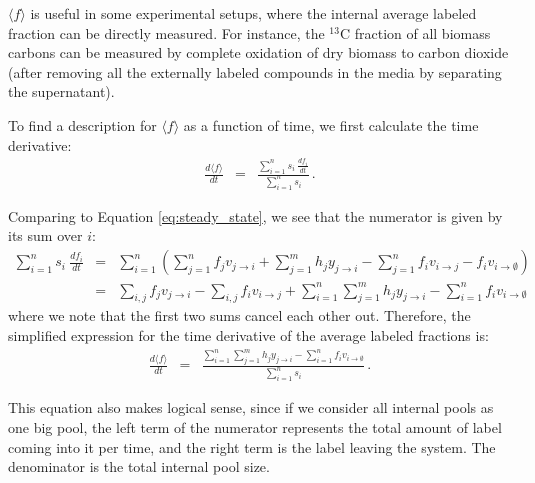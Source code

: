\documentclass{article}
\newcommand{\fin}{\ensuremath{\langle f \rangle}}
\newcommand{\flux}[2]{\ensuremath{v_{{#1} \rightarrow {#2}}}}
\begin{document}
$\fin$ is useful in some experimental setups, where the internal average labeled fraction can be directly measured. For instance, the $^{13}$C fraction of all biomass carbons can be measured by complete oxidation of dry biomass to carbon dioxide (after removing all the externally labeled compounds in the media by separating the supernatant).

To find a description for $\fin$ as a function of time, we first calculate the time derivative:
\begin{eqnarray}
\frac{d\fin}{dt} &=& \frac{\sum_{i=1}^{n} s_i~\frac{d f_i}{dt}}{\sum_{i=1}^{n} s_i} \,.
\end{eqnarray}

Comparing to Equation \ref{eq:steady_state}, we see that the numerator is given by its sum over $i$:
\begin{eqnarray}
    \sum_{i=1}^{n} s_i~\frac{d f_i}{dt} &=& \sum_{i=1}^n \left(\sum_{j=1}^{n} f_j\flux{j}{i} + \sum_{j=1}^m h_j y_{j \rightarrow i} - \sum_{j=1}^n f_i \flux{i}{j} - f_i \flux{i}{\emptyset}\right) \\
    &=& \sum_{i,j} f_j\flux{j}{i} - \sum_{i,j} f_i\flux{i}{j} + 
    \sum_{i=1}^n \sum_{j=1}^m h_j y_{j \rightarrow i} - \sum_{i=1}^n f_i \flux{i}{\emptyset}
\end{eqnarray}
where we note that the first two sums cancel each other out. Therefore, the simplified expression for the time derivative of the average labeled fractions is:
\begin{eqnarray}
    \frac{d\fin}{dt} &=& \frac{\sum_{i=1}^n \sum_{j=1}^m h_j y_{j \rightarrow i} - \sum_{i=1}^n f_i \flux{i}{\emptyset}}{\sum_{i=1}^{n} s_i}\,.
\end{eqnarray}

This equation also makes logical sense, since if we consider all internal pools as one big pool, the left term of the numerator represents the total amount of label coming into it per time, and the right term is the label leaving the system. The denominator is the total internal pool size.
\end{document}
